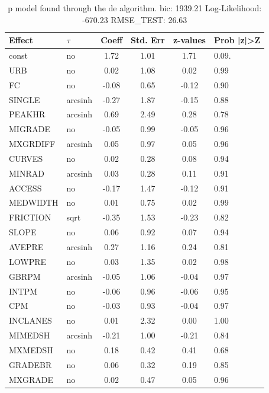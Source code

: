 \begin{table}
	\caption{p model found through the de algorithm. bic: 1939.21 Log-Likelihood: -670.23 RMSE_TEST: 26.63}
	\begin{center}
		\begin{tabular}{|l|l|c|c|c|l|}
			\hline
			Effect & $\tau$ & Coeff & Std. Err & z-values & Prob |z|>Z \\
			\hline
			const & no & 1.72 & 1.01 & 1.71 & 0.09. \\
			\hline
			URB & no & 0.02 & 1.08 & 0.02 & 0.99 \\
			\hline
			FC & no & -0.08 & 0.65 & -0.12 & 0.90 \\
			\hline
			SINGLE & arcsinh & -0.27 & 1.87 & -0.15 & 0.88 \\
			\hline
			PEAKHR & arcsinh & 0.69 & 2.49 & 0.28 & 0.78 \\
			\hline
			MIGRADE & no & -0.05 & 0.99 & -0.05 & 0.96 \\
			\hline
			MXGRDIFF & arcsinh & 0.05 & 0.97 & 0.05 & 0.96 \\
			\hline
			CURVES & no & 0.02 & 0.28 & 0.08 & 0.94 \\
			\hline
			MINRAD & arcsinh & 0.03 & 0.28 & 0.11 & 0.91 \\
			\hline
			ACCESS & no & -0.17 & 1.47 & -0.12 & 0.91 \\
			\hline
			MEDWIDTH & no & 0.01 & 0.75 & 0.02 & 0.99 \\
			\hline
			FRICTION & sqrt & -0.35 & 1.53 & -0.23 & 0.82 \\
			\hline
			SLOPE & no & 0.06 & 0.92 & 0.07 & 0.94 \\
			\hline
			AVEPRE & arcsinh & 0.27 & 1.16 & 0.24 & 0.81 \\
			\hline
			LOWPRE & no & 0.03 & 1.35 & 0.02 & 0.98 \\
			\hline
			GBRPM & arcsinh & -0.05 & 1.06 & -0.04 & 0.97 \\
			\hline
			INTPM & no & -0.06 & 0.96 & -0.06 & 0.95 \\
			\hline
			CPM & no & -0.03 & 0.93 & -0.04 & 0.97 \\
			\hline
			INCLANES & no & 0.01 & 2.32 & 0.00 & 1.00 \\
			\hline
			MIMEDSH & arcsinh & -0.21 & 1.00 & -0.21 & 0.84 \\
			\hline
			MXMEDSH & no & 0.18 & 0.42 & 0.41 & 0.68 \\
			\hline
			GRADEBR & no & 0.06 & 0.32 & 0.19 & 0.85 \\
			\hline
			MXGRADE & no & 0.02 & 0.47 & 0.05 & 0.96 \\

\end{tabular}
\end{center}
\end{table}
